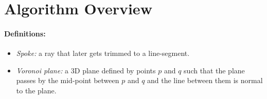 \documentclass[12pt] {article}
\begin{document}


\section*{Algorithm Overview}
\paragraph{Definitions:}
\begin{itemize}
\item \textit{Spoke:} a ray that later gets trimmed to a line-segment.
\item \textit{Voronoi plane:} a 3D plane defined by points $p$ and $q$ such that the plane passes by the mid-point between $p$ and $q$ and the line between them is normal to the plane.
\end{itemize}
\end{document}
